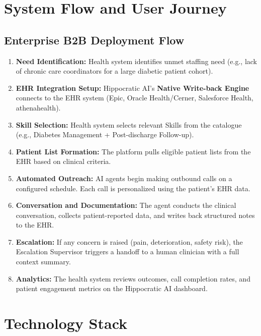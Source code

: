 \documentclass[12pt,a4paper]{article}
\begin{document}
\newpage

\section{System Flow and User Journey}

\subsection{Enterprise B2B Deployment Flow}

\begin{enumerate}
    \item \textbf{Need Identification:} Health system identifies unmet staffing need (e.g., lack of chronic care coordinators for a large diabetic patient cohort).
    \item \textbf{EHR Integration Setup:} Hippocratic AI's \textbf{Native Write-back Engine} connects to the EHR system (Epic, Oracle Health/Cerner, Salesforce Health, athenahealth).
    \item \textbf{Skill Selection:} Health system selects relevant Skills from the catalogue (e.g., Diabetes Management + Post-discharge Follow-up).
    \item \textbf{Patient List Formation:} The platform pulls eligible patient lists from the EHR based on clinical criteria.
    \item \textbf{Automated Outreach:} AI agents begin making outbound calls on a configured schedule. Each call is personalized using the patient's EHR data.
    \item \textbf{Conversation and Documentation:} The agent conducts the clinical conversation, collects patient-reported data, and writes back structured notes to the EHR.
    \item \textbf{Escalation:} If any concern is raised (pain, deterioration, safety risk), the Escalation Supervisor triggers a handoff to a human clinician with a full context summary.
    \item \textbf{Analytics:} The health system reviews outcomes, call completion rates, and patient engagement metrics on the Hippocratic AI dashboard.
\end{enumerate}

\newpage

\section{Technology Stack}
\end{document}
